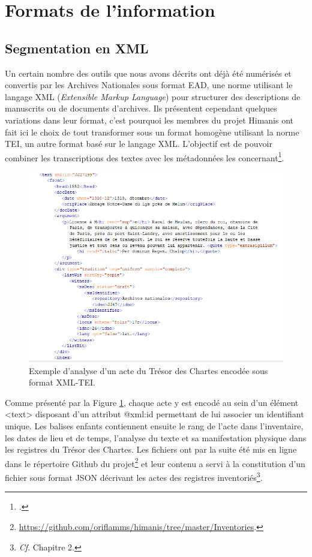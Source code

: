 \documentclass[a4paper,12pt,twoside]{book}
\begin{document}
	\section{Formats de l’information}
	
	\subsection{Segmentation en XML}
	
	Un certain nombre des outils que nous avons décrits ont déjà été numérisés et convertis par les Archives Nationales sous format EAD, une norme utilisant le langage XML (\textit{Extensible Markup Language}) pour structurer des descriptions de manuscrits ou de documents d’archives. Ils présentent cependant quelques variations dans leur format, c'est pourquoi les membres du projet Himanis ont fait ici le choix de tout transformer sous un format homogène utilisant la norme TEI, un autre format basé sur le langage XML. L'objectif est de pouvoir combiner les transcriptions des textes avec les métadonnées les concernant\footcite{stutzmann_recherche_2017}.
	
	\begin{figure}
		\centering
		\includegraphics[width=\textwidth]{Images/Inventaire_en_TEI.png}
		\caption{Exemple d'analyse d'un acte du Trésor des Chartes encodée sous format XML-TEI.}
		\label{inventaire_TEI}
	\end{figure} 
	
	Comme présenté par la Figure \ref{inventaire_TEI}, chaque acte y est encodé au sein d'un élément <text> disposant d'un attribut @xml:id permettant de lui associer un identifiant unique. Les balises enfants contiennent ensuite le rang de l'acte dans l'inventaire, les dates de lieu et de temps, l'analyse du texte et sa manifestation physique dans les registres du Trésor des Chartes. Les fichiers ont par la suite été mis en ligne dans le répertoire Github du projet\footnote{\url{https://github.com/oriflamms/himanis/tree/master/Inventories}.} et leur contenu a servi à la constitution d'un fichier sous format JSON décrivant les actes des registres inventoriés\footnote{\textit{Cf}. Chapitre 2.}.
	
\end{document}
